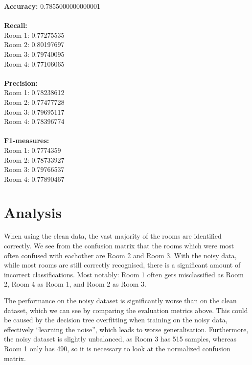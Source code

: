 \documentclass{article}
\begin{document}
\textbf{Accuracy:} 0.7855000000000001 \\
\\
\textbf{Recall:} \\
Room 1: 0.77275535 \\
Room 2: 0.80197697 \\
Room 3: 0.79740095 \\
Room 4: 0.77106065 \\
\\
\textbf{Precision:} \\
Room 1: 0.78238612 \\
Room 2: 0.77477728 \\
Room 3: 0.79695117 \\
Room 4: 0.78396774 \\
\\
\textbf{F1-measures:} \\
Room 1: 0.7774359 \\
Room 2: 0.78733927  \\
Room 3: 0.79766537 \\
Room 4: 0.77890467 \\

\pagebreak

\section{Analysis}

When using the clean data, the vast majority of the rooms are identified
correctly. We see from the confusion matrix that the rooms which were most
often confused with eachother are Room 2 and Room 3. With the noisy data,
while most rooms are still correctly recognised, there is a significant
amount of incorrect classifications. Most notably: Room 1 often gets misclassified as
Room 2, Room 4 as Room 1, and Room 2 as Room 3.
\

The performance on the noisy dataset is significantly worse than on the clean
dataset, which we can see by comparing the evaluation metrics above. This
could be caused by the decision tree overfitting when training on the noisy
data, effectively ``learning the noise'', which leads to worse generalisation.
Furthermore, the noisy dataset is slightly unbalanced, as Room 3 has 515
samples, whereas Room 1 only has 490, so it is necessary to look at the
normalized confusion matrix.
\end{document}
